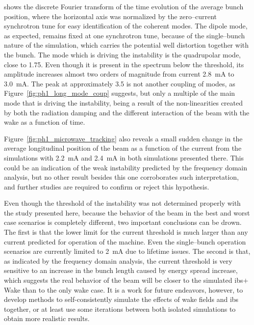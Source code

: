     shows the discrete Fourier transform of the time evolution of the average bunch position, where the horizontal axis was normalized by the zero--current synchrotron tune for easy identification of the coherent modes. The dipole mode, as expected, remains fixed at one synchrotron tune, because of the single--bunch nature of the simulation, which carries the potential well distortion together with the bunch.
    The mode which is driving the instability is the quadrupolar mode, close to \num{1.75}. Even though it is present in the spectrum below the threshold, its amplitude increases almost two orders of magnitude from current \SI{2.8}{\milli\ampere} to \SI{3.0}{\milli\ampere}. The peak at approximately \num{3.5} is not another coupling of modes, as Figure~\ref{fig:ph1_long_mode_coup} suggests, but only a multiple of the main mode that is driving the instability, being a result of the non-linearities created by both the radiation damping and the different interaction of the beam with the wake as a function of time.

    Figure~\ref{fig:ph1_microwave_tracking} also reveals a small sudden change in the average longitudinal position of the beam as a function of the current from the simulations with \SI{2.2}{\milli\ampere} and \SI{2.4}{\milli\ampere} in both simulations presented there. This could be an indication of the weak instability predicted by the frequency domain analysis, but no other result besides this one corroborates such interpretation, and further studies are required to confirm or reject this hypothesis.

    Even though the threshold of the instability was not determined properly with the study presented here, because the behavior of the beam in the best and worst case scenarios is completely different, two important conclusions can be drown. The first is that the lower limit for the current threshold is much larger than any current predicted for operation of the machine. Even the single--bunch operation scenarios are currently limited to \SI{2}{\milli\ampere} due to lifetime issues. The second is that, as indicated by the frequency domain analysis, the current threshold is very sensitive to an increase in the bunch length caused by energy spread increase, which suggests the real behavior of the beam will be closer to the simulated \gls{ibs}$+$Wake than to the only wake case. It is a work for future endeavors, however, to develop methods to self-consistently simulate the effects of wake fields and \gls{ibs} together, or at least use some iterations between both isolated simulations to obtain more realistic results.

